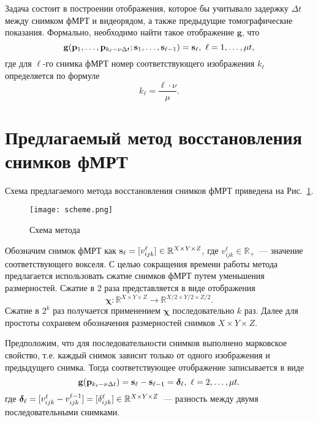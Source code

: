\documentclass[a4paper, 12pt]{extarticle}
\begin{document}
Задача состоит в построении отображения, которое бы учитывало задержку $\Delta t$ между
снимком фМРТ и видеорядом, а также предыдущие томографические показания. Формально, необходимо
найти такое отображение $\mathbf{g}$, что
\begin{equation}
	\label{eq3}
	\mathbf{g}(\mathbf{p}_1, \ldots, \mathbf{p}_{k_{\ell} - \nu \Delta t}; \mathbf{s}_1, \ldots, \mathbf{s}_{\ell-1}) = \mathbf{s}_{\ell},
	\ \ell = 1, \ldots, \mu t,
\end{equation}
где для $\ell$-го снимка фМРТ номер соответствующего изображения $k_{\ell}$ определяется по формуле
\begin{equation}
	\label{eq4}
	k_{\ell} = \dfrac{\ell \cdot \nu}{\mu}.
\end{equation}

\section{Предлагаемый метод восстановления снимков фМРТ}

Схема предлагаемого метода восстановления снимков фМРТ приведена на Рис.~\ref{fig:scheme}.

\begin{figure}[h!]
	\centering
	\texttt{[image: scheme.png]}
	\caption{Схема метода}
	\label{fig:scheme}
\end{figure}

Обозначим снимок фМРТ как $\mathbf{s}_{\ell} = [v^{\ell}_{ijk}] \in \mathbb{R}^{X \times Y \times Z}$,
где $v^{\ell}_{ijk} \in \mathbb{R}_+$~--- значение соответствующего вокселя.
С целью сокращения времени работы метода предлагается использовать сжатие снимков фМРТ путем уменьшения размерностей.
Сжатие в 2 раза представляется в виде отображения
\[\bm{\chi}: \mathbb{R}^{X \times Y \times Z} \to \mathbb{R}^{X/2 \times Y/2 \times Z/2}.\]
Сжатие в $2^k$ раз получается применением $\bm{\chi}$ последовательно $k$ раз. 
Далее для простоты сохраняем обозначения размерностей снимков $X \times Y \times Z$.

Предположим, что для последовательности снимков выполнено марковское свойство,
т.е. каждый снимок зависит только от одного изображения и предыдущего снимка.
Тогда соответствующее отображение записывается в виде
\begin{equation}
	\label{eq5}
	\mathbf{g}(\mathbf{p}_{k_{\ell} - \nu \Delta t}) = \mathbf{s}_{\ell} - \mathbf{s}_{\ell-1} = \boldsymbol{\delta}_{\ell}, \ \ell = 2, \ldots, \mu t.
\end{equation}
где $\boldsymbol{\delta}_{\ell} = [v^{\ell}_{ijk} - v^{\ell-1}_{ijk}] = [\delta^{\ell}_{ijk}] \in \mathbb{R}^{X \times Y \times Z}$~--- разность между двумя последовательными снимками.
\end{document}
